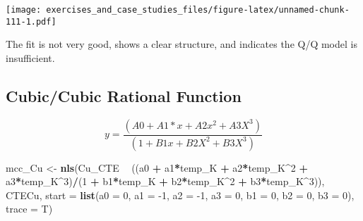 \documentclass[]{book}
\newenvironment{Shaded}{\begin{snugshade}}{\end{snugshade}}
\newcommand{\DataTypeTok}[1]{\textcolor[rgb]{0.13,0.29,0.53}{#1}}
\newcommand{\DecValTok}[1]{\textcolor[rgb]{0.00,0.00,0.81}{#1}}
\newcommand{\KeywordTok}[1]{\textcolor[rgb]{0.13,0.29,0.53}{\textbf{#1}}}
\newcommand{\NormalTok}[1]{#1}
\newcommand{\OperatorTok}[1]{\textcolor[rgb]{0.81,0.36,0.00}{\textbf{#1}}}
\newcommand{\StringTok}[1]{\textcolor[rgb]{0.31,0.60,0.02}{#1}}
\theoremstyle{definition}
\theoremstyle{definition}
\theoremstyle{definition}
\theoremstyle{remark}
\begin{document}
\texttt{[image: exercises\_and\_case\_studies\_files/figure-latex/unnamed-chunk-111-1.pdf]}

The fit is not very good, shows a clear structure, and indicates the Q/Q
model is insufficient.

\hypertarget{cubiccubic-rational-function}{%
\subsection{Cubic/Cubic Rational
Function}\label{cubiccubic-rational-function}}

\[
y = \frac{(A0 + A1*x + A2x^2 + A3X^3)} {(1 + B1x + B2X^2 + B3X^3)}
\]

\begin{Shaded}
\begin{Highlighting}[]
\NormalTok{mcc_Cu <-}\StringTok{ }\KeywordTok{nls}\NormalTok{(Cu_CTE }\OperatorTok{~}\StringTok{ }\NormalTok{((a0 }\OperatorTok{+}\StringTok{ }\NormalTok{a1}\OperatorTok{*}\NormalTok{temp_K }\OperatorTok{+}\StringTok{ }\NormalTok{a2}\OperatorTok{*}\NormalTok{temp_K}\OperatorTok{^}\DecValTok{2} \OperatorTok{+}\StringTok{ }\NormalTok{a3}\OperatorTok{*}\NormalTok{temp_K}\OperatorTok{^}\DecValTok{3}\NormalTok{)}\OperatorTok{/}\NormalTok{(}\DecValTok{1} \OperatorTok{+}\StringTok{ }\NormalTok{b1}\OperatorTok{*}\NormalTok{temp_K }\OperatorTok{+}\StringTok{ }\NormalTok{b2}\OperatorTok{*}\NormalTok{temp_K}\OperatorTok{^}\DecValTok{2} \OperatorTok{+}\StringTok{ }\NormalTok{b3}\OperatorTok{*}\NormalTok{temp_K}\OperatorTok{^}\DecValTok{3}\NormalTok{)), }
\NormalTok{            CTECu, }\DataTypeTok{start =} \KeywordTok{list}\NormalTok{(}\DataTypeTok{a0 =} \DecValTok{0}\NormalTok{, }\DataTypeTok{a1 =} \DecValTok{-1}\NormalTok{, }\DataTypeTok{a2 =} \DecValTok{-1}\NormalTok{, }\DataTypeTok{a3 =} \DecValTok{0}\NormalTok{, }\DataTypeTok{b1 =} \DecValTok{0}\NormalTok{, }\DataTypeTok{b2 =} \DecValTok{0}\NormalTok{, }\DataTypeTok{b3 =} \DecValTok{0}\NormalTok{), }
            \DataTypeTok{trace =}\NormalTok{ T)}
\end{Highlighting}
\end{Shaded}
\end{document}
